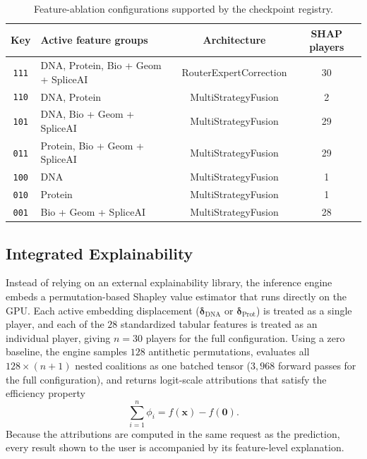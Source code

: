 \begin{table}[htbp]
    \centering
    \caption{Feature-ablation configurations supported by the checkpoint registry.}
    \label{tab:ablation_configs}
    \begin{tabular}{clcc}
        \toprule
        \textbf{Key} & \textbf{Active feature groups} & \textbf{Architecture} & \textbf{SHAP players} \\
        \midrule
        \texttt{111} & DNA, Protein, Bio + Geom + SpliceAI & RouterExpertCorrection & 30 \\
        \texttt{110} & DNA, Protein & MultiStrategyFusion & 2 \\
        \texttt{101} & DNA, Bio + Geom + SpliceAI & MultiStrategyFusion & 29 \\
        \texttt{011} & Protein, Bio + Geom + SpliceAI & MultiStrategyFusion & 29 \\
        \texttt{100} & DNA & MultiStrategyFusion & 1 \\
        \texttt{010} & Protein & MultiStrategyFusion & 1 \\
        \texttt{001} & Bio + Geom + SpliceAI & MultiStrategyFusion & 28 \\
        \bottomrule
    \end{tabular}
\end{table}

\subsection{Integrated Explainability}

Instead of relying on an external explainability library, the inference engine embeds a permutation-based Shapley value estimator that runs directly on the GPU. Each active embedding displacement ($\boldsymbol{\delta}_{\text{DNA}}$ or $\boldsymbol{\delta}_{\text{Prot}}$) is treated as a single player, and each of the $28$ standardized tabular features is treated as an individual player, giving $n = 30$ players for the full configuration. Using a zero baseline, the engine samples $128$ antithetic permutations, evaluates all $128 \times (n + 1)$ nested coalitions as one batched tensor ($3{,}968$ forward passes for the full configuration), and returns logit-scale attributions that satisfy the efficiency property
\[
    \sum_{i=1}^{n} \phi_i = f(\mathbf{x}) - f(\mathbf{0}).
\]
Because the attributions are computed in the same request as the prediction, every result shown to the user is accompanied by its feature-level explanation.

